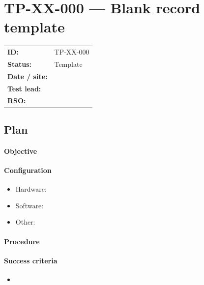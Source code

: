 \section{TP-XX-000 --- Blank record template}


\begin{tabular}{@{}ll@{}}
\textbf{ID:} & TP-XX-000 \\
\textbf{Status:} & Template \\
\textbf{Date / site:} & \todo{} \\
\textbf{Test lead:} & \todo{} \\
\textbf{RSO:} & \todo{} \\
\end{tabular}

\subsection*{Plan}

\paragraph{Objective}
\todo{}

\paragraph{Configuration}
\begin{itemize}
  \item Hardware: \todo{}
  \item Software: \todo{}
  \item Other: \todo{}
\end{itemize}

\paragraph{Procedure}
\todo{}

\paragraph{Success criteria}
\begin{itemize}
  \item \todo{}
\end{itemize}

